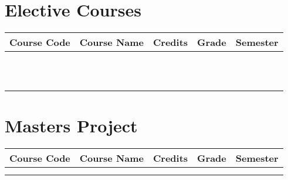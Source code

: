 \documentclass{article}
\begin{document}
\section*{Elective Courses}
\begin{center}
\begin{tabularx}{\textwidth}{|l|X|c|c|c|}
    \hline
    \textbf{Course Code} & \textbf{Course Name} & \textbf{Credits} & \textbf{Grade} & \textbf{Semester} \\
    \hline
    &  &  &  &  \\
    \hline
    &  &  &  &  \\
    \hline
    &  &  &  &  \\
    \hline
    &  &  &  &  \\
    \hline
   &  &  &  &  \\
    \hline
    &  &  &  &  \\
    \hline
   &  &  &  &  \\
    \hline
   &  &  &  &  \\
    \hline
    &  &  &  &  \\
    \hline
   &  &  &  &  \\
    \hline
    &  &  &  &  \\
    \hline
\end{tabularx}
\end{center}

\section*{Masters Project}
\begin{center}
\begin{tabularx}{\textwidth}{|l|X|c|c|c|}
    \hline
    \textbf{Course Code} & \textbf{Course Name} & \textbf{Credits} & \textbf{Grade} & \textbf{Semester} \\
    \hline
    &  &  &  &  \\
    \hline
    &  &  &  &  \\
    \hline
\end{tabularx}
\end{center}
\end{document}
